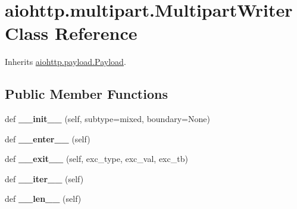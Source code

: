 \hypertarget{classaiohttp_1_1multipart_1_1_multipart_writer}{}\section{aiohttp.\+multipart.\+Multipart\+Writer Class Reference}
\label{classaiohttp_1_1multipart_1_1_multipart_writer}


Inherits \hyperlink{classaiohttp_1_1payload_1_1_payload}{aiohttp.\+payload.\+Payload}.

\subsection*{Public Member Functions}
\begin{DoxyCompactItemize}
\item 
\mbox{\label{classaiohttp_1_1multipart_1_1_multipart_writer_a12face73b5230804303ce38b150daa2c}} 
def {\bfseries \+\_\+\+\_\+init\+\_\+\+\_\+} (self, subtype=\textquotesingle{}mixed\textquotesingle{}, boundary=None)
\item 
\mbox{\label{classaiohttp_1_1multipart_1_1_multipart_writer_ac765c8ac7b986595f4456e8990992d0c}} 
def {\bfseries \+\_\+\+\_\+enter\+\_\+\+\_\+} (self)
\item 
\mbox{\label{classaiohttp_1_1multipart_1_1_multipart_writer_a3b54903d2c7c8124a27faa49998da90b}} 
def {\bfseries \+\_\+\+\_\+exit\+\_\+\+\_\+} (self, exc\+\_\+type, exc\+\_\+val, exc\+\_\+tb)
\item 
\mbox{\label{classaiohttp_1_1multipart_1_1_multipart_writer_ac29dff98c4d2ea8567515988787873e5}} 
def {\bfseries \+\_\+\+\_\+iter\+\_\+\+\_\+} (self)
\item 
\mbox{\label{classaiohttp_1_1multipart_1_1_multipart_writer_af9cf06eedab0f05bc983a85e1ce6a22c}} 
def {\bfseries \+\_\+\+\_\+len\+\_\+\+\_\+} (self)
\item 
\mbox{\label{classaiohttp_1_1multipart_1_1_multipart_writer_aa4c09a229123f829a8a24a52522e05f8}} 

\end{DoxyCompactItemize}
